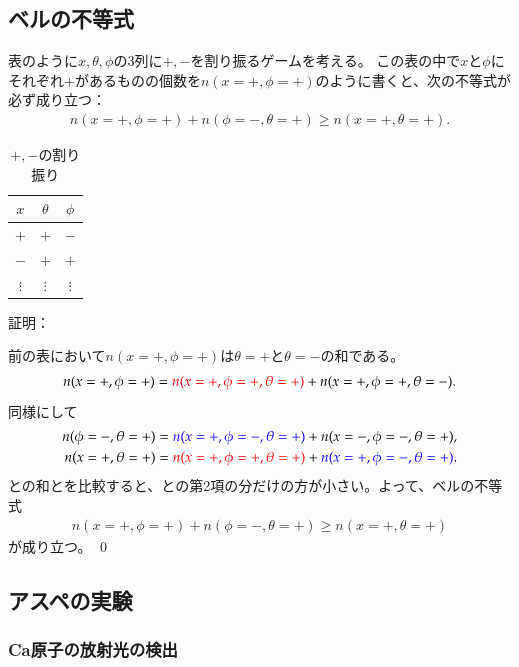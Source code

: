 \documentclass[10pt,b5paper,papersize,dvipdfmx]{jsbook}
\begin{document}
%
\subsection{ベルの不等式}

表のように$x, \theta, \phi$の3列に$+, -$を割り振るゲームを考える。
この表の中で$x$と$\phi$にそれぞれ$+$があるものの個数を$n(x=+,\phi=+)$のように書くと、次の不等式が必ず成り立つ：
\begin{align*}
  n(x=+,\phi=+) + n(\phi=-,\theta=+) \ge n(x=+,\theta=+).
\end{align*}

\begin{table}[htbp]
  \centering
  \caption{$+, -$の割り振り}
  \begin{tabular}{ccc} \hline
    $x$ & $\theta$ & $\phi$ \\ \hline
    $+$ & $+$ & $-$ \\
    $-$ & $+$ & $+$ \\
    $\vdots$ & $\vdots$ & $\vdots$ \\ \hline
  \end{tabular}
\end{table}

\noindent 証明：\par
前の表において$n(x=+,\phi=+)$は$\theta = +$と$\theta = -$の和である。
\begin{align}
  \label{eq:bell-1}
  n(x=+,\phi=+) = \textcolor{red}{n(x=+,\phi=+, \theta=+)} + n(x=+,\phi=+, \theta=-).
\end{align}
同様にして
\begin{align}
  \label{eq:bell-2}
  n(\phi=-,\theta=+) &= \textcolor{blue}{n(x=+, \phi=-,\theta=+)} + n(x=-, \phi=-,\theta=+)
  , \\
  \label{eq:bell-3}
  n(x=+,\theta=+) &= \textcolor{red}{n(x=+, \phi=+, \theta=+)} + \textcolor{blue}{n(x=+, \phi=-, \theta=+)}.
\end{align}
との和とを比較すると、との第2項の分だけの方が小さい。よって、ベルの不等式
\begin{align*}
  n(x=+,\phi=+) + n(\phi=-,\theta=+) \ge n(x=+,\theta=+)
\end{align*}
が成り立つ。
\qed

%
\subsection{アスペの実験}

%
\subsubsection{Ca原子の放射光の検出}
\end{document}
